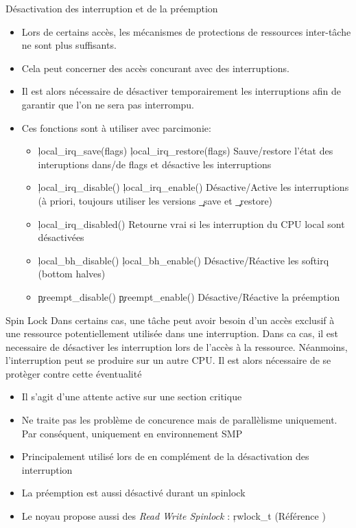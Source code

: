 \begin{frame}[fragile=singleslide]{Désactivation des interruption et de la préemption}
  \begin{itemize} 
  \item  Lors de  certains  accès, les  mécanismes  de protections  de
    ressources inter-tâche ne sont plus suffisants.
  \item   Cela   peut  concerner   des   accès   concurant  avec   des
    interruptions.
  \item  Il  est alors  nécessaire  de  désactiver temporairement  les
    interruptions afin de garantir que l'on ne sera pas interrompu.
  \item   Ces fonctions sont à utiliser avec parcimonie:
    \begin{itemize} 
    \item    \c{local_irq_save(flags)}    \c{local_irq_restore(flags)}
      Sauve/restore l'état des interuptions dans/de flags et désactive
      les interruptions
    \item        \c{local_irq_disable()}        \c{local_irq_enable()}
      Désactive/Active les interruptions  (à priori, toujours utiliser
      les versions \c{_save} et \c{_restore})
    \item \c{local_irq_disabled()}  Retourne vrai si les interruption
      du CPU local sont désactivées
    \item         \c{local_bh_disable()}         \c{local_bh_enable()}
      Désactive/Réactive les softirq (bottom halves)
    \item          \c{preempt_disable()}          \c{preempt_enable()}
      Désactive/Réactive la préemption
    \end{itemize} 
  \end{itemize} 
\end{frame} 

\begin{frame}[fragile=singleslide]{Spin Lock}
  Dans certains cas, une tâche peut avoir besoin d'un accès exclusif à
  une ressource  potentiellement utilisée dans  une interruption. Dans
  ca cas,  il est  necessaire de désactiver  les interruption  lors de
  l'accès à la ressource.   Néanmoins, l'interruption peut se produire
  sur un  autre CPU.   Il est alors  nécessaire de se  protèger contre
  cette éventualité
  \begin{itemize} 
  \item Il s'agit d'une attente active sur une section critique
  \item Ne traite pas les  problème de concurence mais de parallèlisme
    uniquement. Par conséquent, uniquement en environnement SMP
  \item   Principalement  utilisé   lors  de   en  complément   de  la
    désactivation des interruption
  \item La préemption est aussi désactivé durant un spinlock
  \item Le noyau propose aussi des \emph{Read Write Spinlock} : \c{rwlock_t} (Référence )
  \end{itemize}  
\end{frame}

